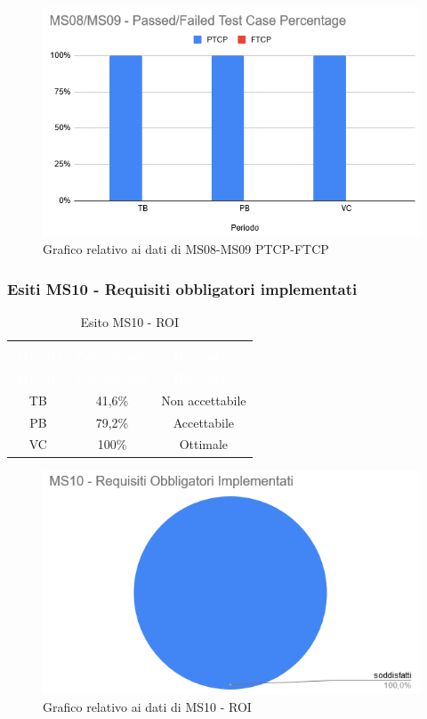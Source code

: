 \begin{figure}[H]
\centering
\includegraphics[scale=0.7]{./img/MS08-MS09.png}
\caption{Grafico relativo ai dati di MS08-MS09 PTCP-FTCP}
\end{figure}

\subsubsection{Esiti MS10 - Requisiti obbligatori implementati}
\begin{longtable}{c c c}
\rowcolor{white}\caption{Esito MS10 - ROI} \\
	\rowcolor{redafk}
\textcolor{white}{\textbf{Attività}} &
\textcolor{white}{\textbf{Percentuale}} & 
\textcolor{white}{\textbf{Riscontro}} \\
	\endfirsthead
\textcolor{white}{\textbf{Attività}} &
\textcolor{white}{\textbf{Percentuale}} & 
\textcolor{white}{\textbf{Riscontro}} \\
	\endhead
	TB & 41,6\% & Non accettabile\\
	PB & 79,2\% & Accettabile\\
	VC & 100\% & Ottimale\\
\end{longtable}

\begin{figure}[H]
\centering
\includegraphics[scale=0.7]{./img/MS10.png}
\caption{Grafico relativo ai dati di MS10 - ROI}
\end{figure}
\pagebreak
